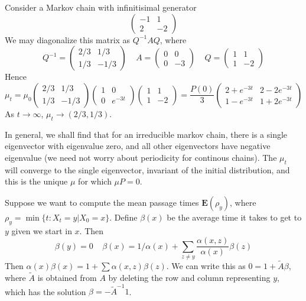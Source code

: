 \begin{example}
    Consider a Markov chain with infinitisimal generator
    \[ \begin{pmatrix} -1 & 1 \\ 2 & -2 \end{pmatrix} \]
    We may diagonalize this matrix as $Q^{-1}AQ$, where
    \[ Q^{-1} = \begin{pmatrix} 2/3 & 1/3 \\ 1/3 & -1/3 \end{pmatrix}\ \ \ \ \ A = \begin{pmatrix} 0 & 0 \\ 0 & -3 \end{pmatrix}\ \ \ \ \ Q = \begin{pmatrix} 1 & 1 \\ 1 & -2 \end{pmatrix} \]
    Hence
    \[ \mu_t = \mu_0 \begin{pmatrix} 2/3 & 1/3 \\ 1/3 & -1/3 \end{pmatrix} \begin{pmatrix} 1 & 0 \\ 0 & e^{-3t} \end{pmatrix} \begin{pmatrix} 1 & 1 \\ 1 & -2 \end{pmatrix} = \frac{P(0)}{3} \begin{pmatrix} 2 + e^{-3t} & 2 - 2e^{-3t} \\ 1 - e^{-3t} & 1 + 2e^{-3t} \end{pmatrix} \]
    As $t \to \infty$, $\mu_t \to (2/3, 1/3)$.
\end{example}

In general, we shall find that for an irreducible markov chain, there is a single eigenvector with eigenvalue zero, and all other eigenvectors have negative eigenvalue (we need not worry about periodicity for continous chains). The $\mu_t$ will converge to the single eigenvector, invariant of the initial distribution, and this is the unique $\mu$ for which $\mu P = 0$.

Suppose we want to compute the mean passage times $\mathbf{E}(\rho_y)$, where $\rho_y = \min \{ t : X_t = y | X_0 = x \}$. Define $\beta(x)$ be the average time it takes to get to $y$ given we start in $x$. Then
%
\[ \beta(y) = 0\ \ \ \ \ \beta(x) = 1/\alpha(x) + \sum_{z \neq y} \frac{\alpha(x,z)}{\alpha(x)} \beta(z) \]
%
Then $\alpha(x) \beta(x) = 1 + \sum \alpha(x,z) \beta(z)$. We can write this as $0 = 1 + \tilde{A} \beta$, where $\tilde{A}$ is obtained from $A$ by deleting the row and column representing $y$, which has the solution $\beta = -\tilde{A}^{-1} 1$.

